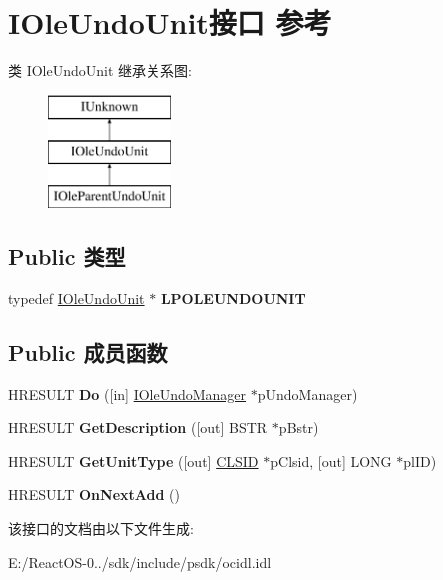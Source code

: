 \hypertarget{interface_i_ole_undo_unit}{}\section{I\+Ole\+Undo\+Unit接口 参考}
\label{interface_i_ole_undo_unit}
类 I\+Ole\+Undo\+Unit 继承关系图\+:\begin{figure}[H]
\begin{center}
\leavevmode
\includegraphics[height=3.000000cm]{interface_i_ole_undo_unit}
\end{center}
\end{figure}
\subsection*{Public 类型}
\begin{DoxyCompactItemize}
\item 
\mbox{\label{interface_i_ole_undo_unit_aa610be323b272f118011218c0585edbb}} 
typedef \hyperlink{interface_i_ole_undo_unit}{I\+Ole\+Undo\+Unit} $\ast$ {\bfseries L\+P\+O\+L\+E\+U\+N\+D\+O\+U\+N\+IT}
\end{DoxyCompactItemize}
\subsection*{Public 成员函数}
\begin{DoxyCompactItemize}
\item 
\mbox{\label{interface_i_ole_undo_unit_a0176739d92a8d60fb09491f3017b768f}} 
H\+R\+E\+S\+U\+LT {\bfseries Do} (\mbox{[}in\mbox{]} \hyperlink{interface_i_ole_undo_manager}{I\+Ole\+Undo\+Manager} $\ast$p\+Undo\+Manager)
\item 
\mbox{\label{interface_i_ole_undo_unit_ad4781f3d67a9dc853f8fb1f05d247c90}} 
H\+R\+E\+S\+U\+LT {\bfseries Get\+Description} (\mbox{[}out\mbox{]} B\+S\+TR $\ast$p\+Bstr)
\item 
\mbox{\label{interface_i_ole_undo_unit_a99e2a812a4a60c63556dfa016b55755f}} 
H\+R\+E\+S\+U\+LT {\bfseries Get\+Unit\+Type} (\mbox{[}out\mbox{]} \hyperlink{struct___i_i_d}{C\+L\+S\+ID} $\ast$p\+Clsid, \mbox{[}out\mbox{]} L\+O\+NG $\ast$pl\+ID)
\item 
\mbox{\label{interface_i_ole_undo_unit_a9626031c8dbbac518fc3a7ed5dcee578}} 
H\+R\+E\+S\+U\+LT {\bfseries On\+Next\+Add} ()
\end{DoxyCompactItemize}


该接口的文档由以下文件生成\+:\begin{DoxyCompactItemize}
\item 
E\+:/\+React\+O\+S-\/0../sdk/include/psdk/ocidl.\+idl\end{DoxyCompactItemize}

